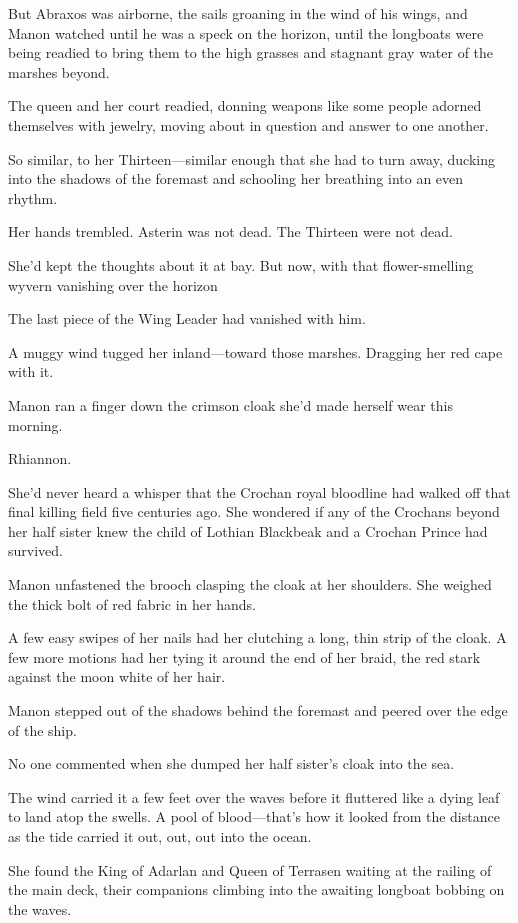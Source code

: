 But Abraxos was airborne, the sails groaning in the wind of his wings, and Manon watched until he was a speck on the horizon, until the longboats were being readied to bring them to the high grasses and stagnant gray water of the marshes beyond.

The queen and her court readied, donning weapons like some people adorned themselves with jewelry, moving about in question and answer to one another.

So similar, to her Thirteen---similar enough that she had to turn away, ducking into the shadows of the foremast and schooling her breathing into an even rhythm.

Her hands trembled. Asterin was not dead. The Thirteen were not dead.

She'd kept the thoughts about it at bay. But now, with that flower-smelling wyvern vanishing over the horizon 

The last piece of the Wing Leader had vanished with him.

A muggy wind tugged her inland---toward those marshes. Dragging her red cape with it.

Manon ran a finger down the crimson cloak she'd made herself wear this morning.

Rhiannon.

She'd never heard a whisper that the Crochan royal bloodline had walked off that final killing field five centuries ago. She wondered if any of the Crochans beyond her half sister knew the child of Lothian Blackbeak and a Crochan Prince had survived.

Manon unfastened the brooch clasping the cloak at her shoulders. She weighed the thick bolt of red fabric in her hands.

A few easy swipes of her nails had her clutching a long, thin strip of the cloak. A few more motions had her tying it around the end of her braid, the red stark against the moon white of her hair.

Manon stepped out of the shadows behind the foremast and peered over the edge of the ship.

No one commented when she dumped her half sister's cloak into the sea.

The wind carried it a few feet over the waves before it fluttered like a dying leaf to land atop the swells. A pool of blood---that's how it looked from the distance as the tide carried it out, out, out into the ocean.

She found the King of Adarlan and Queen of Terrasen waiting at the railing of the main deck, their companions climbing into the awaiting longboat bobbing on the waves.

